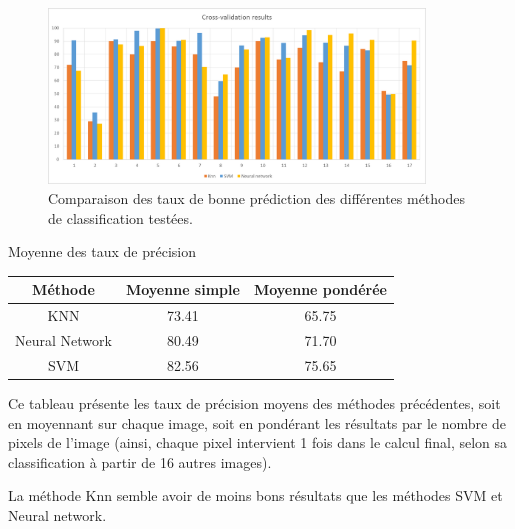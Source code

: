 \documentclass[a4paper,10pt]{report}
\begin{document}
\begin{figure}[htbp]
  \caption{Comparaison des taux de bonne prédiction des différentes méthodes de classification testées.}
  \centering
  \includegraphics[width=10cm]{Compared_CV.png}
\end{figure}

\begin{center}
Moyenne des taux de précision\\

\begin{tabular}{|c|c|c|}  
  \hline
  Méthode & Moyenne simple & Moyenne pondérée\\
  \hline
  KNN & 73.41 & 65.75\\
  Neural Network & 80.49 & 71.70\\  
  SVM & 82.56 & 75.65\\
  \hline
\end{tabular}
\end{center}

Ce tableau présente les taux de précision moyens des méthodes précédentes, soit en moyennant sur chaque image, soit en pondérant les résultats par le nombre de pixels de l'image (ainsi, chaque pixel intervient 1 fois dans le calcul final, selon sa classification à partir de 16 autres images).

La méthode Knn semble avoir de moins bons résultats que les méthodes SVM et Neural network. 
\end{document}
